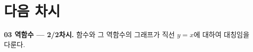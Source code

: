 \documentclass[11pt,a4paper]{article}
\begin{document}
\section{다음 차시}
\begin{calloutbox}
\textbf{03 역함수 --- 2/2차시.} 함수와 그 역함수의 그래프가 직선 $y=x$에 대하여 대칭임을 다룬다.
\end{calloutbox}
\end{document}
